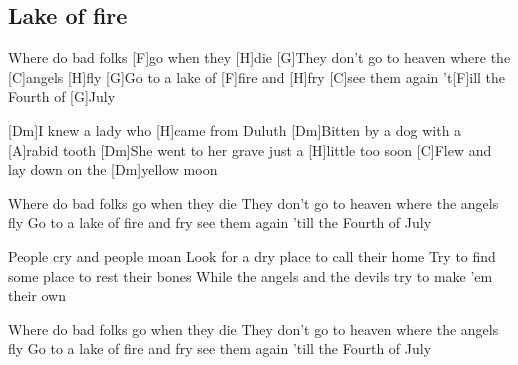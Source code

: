 \subsection*{Lake of fire   }
\begin{guitar}
[G]Where do bad folks [F]go when they [H]die
[G]They don't go to heaven where the [C]angels [H]fly
[G]Go to a lake of [F]fire and [H]fry
[C]see them again 't[F]ill the Fourth of [G]July




[Dm]I knew a lady who [H]came from Duluth
[Dm]Bitten by a dog with a [A]rabid tooth
[Dm]She went to her grave just a [H]little too soon
[C]Flew and lay down on the [Dm]yellow moon

Where do bad folks go when they die
They don't go to heaven where the angels fly
Go to a lake of fire and fry
see them again 'till the Fourth of July




People cry and people moan
Look for a dry place to call their home
Try to find some place to rest their bones
While the angels and the devils try to make 'em their own

Where do bad folks go when they die
They don't go to heaven where the angels fly
Go to a lake of fire and fry
see them again 'till the Fourth of July


\end{guitar}
